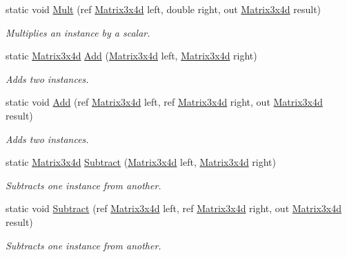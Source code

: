 \begin{DoxyCompactItemize}
static void \hyperlink{struct_open_t_k_1_1_matrix3x4d_a149b02cc555d332e58d53fdfc3397a8e}{Mult} (ref \hyperlink{struct_open_t_k_1_1_matrix3x4d}{Matrix3x4d} left, double right, out \hyperlink{struct_open_t_k_1_1_matrix3x4d}{Matrix3x4d} result)
\begin{DoxyCompactList}\small\item\em Multiplies an instance by a scalar. \end{DoxyCompactList}\item 
static \hyperlink{struct_open_t_k_1_1_matrix3x4d}{Matrix3x4d} \hyperlink{struct_open_t_k_1_1_matrix3x4d_a517f883b1a6825bcfb2cbaf27519ffb6}{Add} (\hyperlink{struct_open_t_k_1_1_matrix3x4d}{Matrix3x4d} left, \hyperlink{struct_open_t_k_1_1_matrix3x4d}{Matrix3x4d} right)
\begin{DoxyCompactList}\small\item\em Adds two instances. \end{DoxyCompactList}\item 
static void \hyperlink{struct_open_t_k_1_1_matrix3x4d_a056fb3638bc840b13a90ae06f591de54}{Add} (ref \hyperlink{struct_open_t_k_1_1_matrix3x4d}{Matrix3x4d} left, ref \hyperlink{struct_open_t_k_1_1_matrix3x4d}{Matrix3x4d} right, out \hyperlink{struct_open_t_k_1_1_matrix3x4d}{Matrix3x4d} result)
\begin{DoxyCompactList}\small\item\em Adds two instances. \end{DoxyCompactList}\item 
static \hyperlink{struct_open_t_k_1_1_matrix3x4d}{Matrix3x4d} \hyperlink{struct_open_t_k_1_1_matrix3x4d_a07f3ab2b6af703b5b458bed9e9077a41}{Subtract} (\hyperlink{struct_open_t_k_1_1_matrix3x4d}{Matrix3x4d} left, \hyperlink{struct_open_t_k_1_1_matrix3x4d}{Matrix3x4d} right)
\begin{DoxyCompactList}\small\item\em Subtracts one instance from another. \end{DoxyCompactList}\item 
static void \hyperlink{struct_open_t_k_1_1_matrix3x4d_a7aa22b5a3a1e4b35388563c8a26d0123}{Subtract} (ref \hyperlink{struct_open_t_k_1_1_matrix3x4d}{Matrix3x4d} left, ref \hyperlink{struct_open_t_k_1_1_matrix3x4d}{Matrix3x4d} right, out \hyperlink{struct_open_t_k_1_1_matrix3x4d}{Matrix3x4d} result)
\begin{DoxyCompactList}\small\item\em Subtracts one instance from another. \end{DoxyCompactList}\item 

\end{DoxyCompactItemize}
